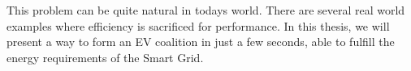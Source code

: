This problem can be quite natural in todays world. There are several real world examples where efficiency is sacrificed for performance. In this thesis, we will present a way to form an EV coalition in just a few seconds, able to fulfill the energy requirements of the Smart Grid.






